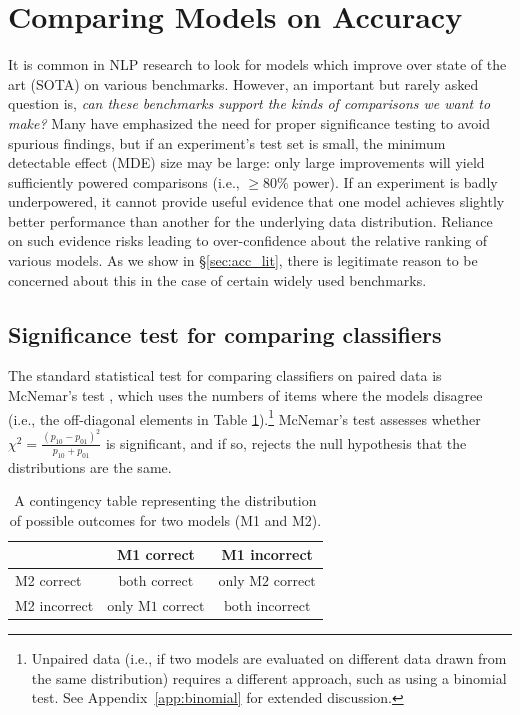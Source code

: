\documentclass[11pt,a4paper]{article}
\begin{document}
\section{Comparing Models on Accuracy} \label{sec:accuracy}
It is common in 
NLP research to look for models which improve over state of the art (SOTA) on various benchmarks.
However, an important but rarely asked question is, \emph{can these benchmarks support the kinds of comparisons we want to make?}
Many have emphasized the need for proper significance testing to avoid spurious findings, but 
if an experiment's test set is small, the minimum detectable effect (MDE) size 
may be large:
only large 
improvements will 
yield sufficiently powered comparisons (i.e., $\geq 80\%$ power).
If an experiment is badly underpowered, it cannot provide useful evidence that one model achieves slightly better performance than another for the underlying data distribution. Reliance on such evidence risks leading to over-confidence about the relative ranking of various models.
As we show in \S\ref{sec:acc_lit}, there is legitimate reason to be concerned about this in the case of certain widely used benchmarks.


\subsection{Significance test for comparing classifiers}
\label{sec:mcnemar}


The standard statistical test for comparing classifiers on paired data is McNemar's test \citep{dietterich1998approximate,dror.2018}, which uses the numbers of items where the models disagree (i.e., the off-diagonal elements in Table \ref{tab:contingency}).\footnote{Unpaired data (i.e., if two models are evaluated on different data drawn from the same distribution) requires a different approach, such as using a binomial test. See Appendix~\ref{app:binomial} for extended discussion.} 
McNemar's test assesses whether $\chi^2 = \frac{\left( p_{10} - p_{01} \right)^2}{p_{10} + p_{01}}$ is significant, and if so, rejects the null hypothesis that the distributions are the same.  
\begin{table}[!htb]
\begin{center}
\small
\begin{tabular}{l|cc}
        & M1 correct & M1 incorrect\\\hline
M2 correct & $\textrm{both correct}$ & $\textrm{only M2 correct}$\\ 
M2 incorrect & $\textrm{only M1 correct}$ & $\textrm{both incorrect}$\\ 
\end{tabular}
\end{center}
    \caption{A contingency table representing the distribution of possible outcomes for two models (M1 and M2).}
    \label{tab:contingency}
\end{table}
\end{document}

